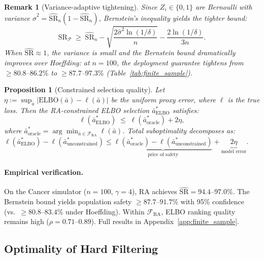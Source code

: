 \documentclass{article}
\newtheorem{proposition}[theorem]{Proposition}
\newtheorem{remark}{Remark}
\newcommand{\ba}{\bar{a}}
\newcommand{\cF}{\mathcal{F}}
\newcommand{\cP}{\mathcal{P}}
\begin{document}
\begin{remark}[Variance-adaptive tightening]
\label{rem:bernstein}
Since $Z_i \in \{0,1\}$ are Bernoulli with variance $\hat{\sigma}^2 = \widehat{\mathrm{SR}}_n(1 - \widehat{\mathrm{SR}}_n)$, Bernstein's inequality yields the tighter bound:
\begin{equation}
\label{eq:bernstein_bound}
\mathrm{SR}_\cP \;\geq\; \widehat{\mathrm{SR}}_n - \sqrt{\frac{2\hat{\sigma}^2 \ln(1/\delta)}{n}} - \frac{2\ln(1/\delta)}{3n}.
\end{equation} When $\widehat{\mathrm{SR}} \approx 1$, the variance is small and the Bernstein bound dramatically improves over Hoeffding: at $n = 100$, the deployment guarantee tightens from $\geq 80.8$--$86.2\%$ to $\geq 87.7$--$97.3\%$ (Table~\ref{tab:finite_sample}).
\end{remark}

\begin{proposition}[Constrained selection quality]
\label{prop:quality}
Let $\eta := \sup_{\ba} |\mathrm{ELBO}(\ba) - \ell(\ba)|$ be the uniform proxy error, where $\ell$ is the true loss. Then the RA-constrained ELBO selection $\ba^*_{\mathrm{ELBO}}$ satisfies:
\begin{equation}
\label{eq:quality_bound}
\ell(\ba^*_{\mathrm{ELBO}}) \;\leq\; \ell(\ba^*_{\mathrm{oracle}}) + 2\eta,
\end{equation}
where $\ba^*_{\mathrm{oracle}} = \arg\min_{\ba \in \cF_{\mathrm{RA}}} \ell(\ba)$. Total suboptimality decomposes as:
$\ell(\ba^*_{\mathrm{ELBO}}) - \ell(\ba^*_{\mathrm{unconstrained}}) \leq \underbrace{\ell(\ba^*_{\mathrm{oracle}}) - \ell(\ba^*_{\mathrm{unconstrained}})}_{\text{price of safety}} + \underbrace{2\eta}_{\text{model error}}.$
\end{proposition}

\paragraph{Empirical verification.} On the Cancer simulator ($n = 100$, $\gamma = 4$), RA achieves $\widehat{\mathrm{SR}} = 94.4$--$97.0\%$. The Bernstein bound yields population safety $\geq 87.7$--$91.7\%$ with 95\% confidence (vs.\ $\geq 80.8$--$83.4\%$ under Hoeffding). Within $\cF_{\mathrm{RA}}$, ELBO ranking quality remains high ($\rho = 0.71$--$0.89$). Full results in Appendix~\ref{app:finite_sample}.


\subsection{Optimality of Hard Filtering}
\label{sec:pareto_optimality}
\end{document}
